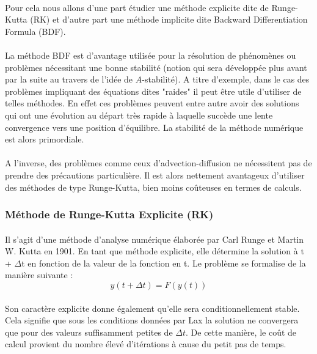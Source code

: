         \paragraph{}
        Pour cela nous allons d'une part étudier une méthode explicite dite de Runge-Kutta (RK) et d'autre part une méthode implicite dite Backward Differentiation Formula (BDF).

        \paragraph{}
        La méthode BDF est d'avantage utilisée pour la résolution de phénomènes ou problèmes nécessitant une bonne stabilité (notion qui sera développée plus avant par la suite au travers de l'idée de $A$-stabilité). A titre d'exemple, dans le cas des problèmes impliquant des équations dites "raides" il peut être utile d'utiliser de telles méthodes. En effet ces problèmes peuvent entre autre avoir des solutions qui ont une évolution au départ très rapide à laquelle succède une lente convergence vers une position d'équilibre. La stabilité de la méthode numérique est alors primordiale.

        \paragraph{}
        A l'inverse, des problèmes comme ceux d'advection-diffusion ne nécessitent pas de prendre des précautions particulière. Il est alors nettement avantageux d'utiliser des méthodes de type Runge-Kutta, bien moins coûteuses en termes de calculs.

    \subsubsection{Méthode de Runge-Kutta Explicite (RK)}
        \paragraph{}
        Il s'agit d'une méthode d'analyse numérique élaborée par Carl Runge et Martin W. Kutta en 1901. En tant que méthode explicite, elle détermine la solution à t +  $\Delta$t en fonction de la valeur de la fonction en t. Le problème se formalise de la manière suivante :
        \begin{equation}
            y(t + \Delta t) = F(y(t))
        \end{equation}

        \paragraph{}
        Son caractère explicite donne également qu'elle sera conditionnellement stable. Cela signifie que sous les conditions données par Lax la solution ne convergera que pour des valeurs suffisamment petites de $\Delta t$. De cette manière, le coût de calcul provient du nombre élevé d'itérations à cause du petit pas de temps.

